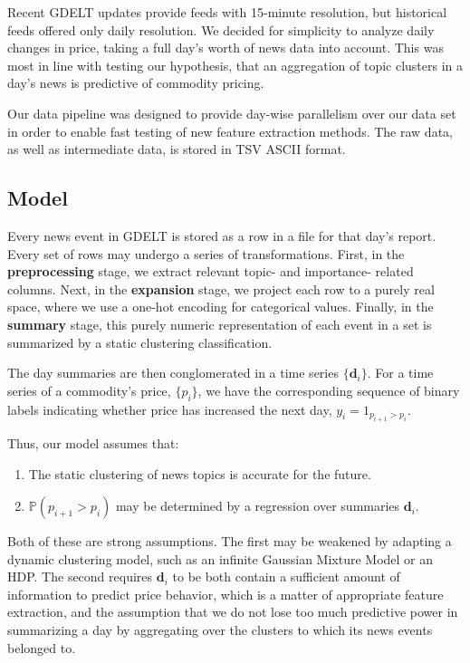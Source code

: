 Recent GDELT updates provide feeds with 15-minute resolution, but historical feeds offered only daily resolution. We decided for simplicity to analyze daily changes in price, taking a full day's worth of news data into account. This was most in line with testing our hypothesis, that an aggregation of topic clusters in a day's news is predictive of commodity pricing.

Our data pipeline was designed to provide day-wise parallelism over our data set in order to enable fast testing of new feature extraction methods. The raw data, as well as intermediate data, is stored in TSV ASCII format.

\subsection{Model}

Every news event in GDELT is stored as a row in a file for that day's report. Every set of rows may undergo a series of transformations. First, in the \textbf{preprocessing} stage, we extract relevant topic- and importance- related columns. Next, in the \textbf{expansion} stage, we project each row to a purely real space, where we use a one-hot encoding for categorical values. Finally, in the \textbf{summary} stage, this purely numeric representation of each event in a set is summarized by a static clustering classification.

The day summaries are then conglomerated in a time series $\{\textbf{d}_i\}$. For a time series of a commodity's price, $\{p_i\}$, we have the corresponding sequence of binary labels indicating whether price has increased the next day, $y_i=1_{p_{i+1}>p_i}$.

Thus, our model assumes that:
\begin{enumerate}
\item The static clustering of news topics is accurate for the future.
\item $\mathbb{P}(p_{i+1}>p_i)$ may be determined by a regression over summaries $\textbf{d}_i$. 
\end{enumerate}

Both of these are strong assumptions. The first may be weakened by adapting a dynamic clustering model, such as an infinite Gaussian Mixture Model or an HDP. The second requires $\textbf{d}_i$ to be both contain a sufficient amount of information to predict price behavior, which is a matter of appropriate feature extraction, and the assumption that we do not lose too much predictive power in summarizing a day by aggregating over the clusters to which its news events belonged to.

